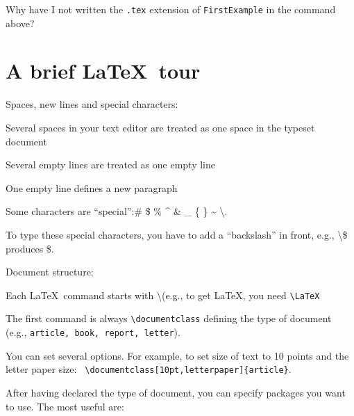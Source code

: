 Why have I not written the {\tt *.tex} extension of {\tt FirstExample} 
in the command above?  

\section{A brief \LaTeX~tour}

\begin{compactitem}\itemsep12pt
\item Spaces, new lines and special characters:

\begin{compactitem} \setlength{\itemindent}{-1em}\itemsep2pt
  \item Several spaces in your text editor are treated as one space in the
typeset document
  \item Several empty lines are treated as one empty line
  \item One empty line defines a new paragraph
  \item Some characters are ``special'':\# \$ \% \^{} \& \_ \{ \}
\~{} \textbackslash. 
  \item To type these special characters, you have to add a ``backslash'' in
front, e.g., \textbackslash\$ produces \$.
\end{compactitem}

\item Document structure:

\begin{compactitem} \setlength{\itemindent}{-1em}\itemsep2pt
  \item Each \LaTeX~command starts with \textbackslash (e.g., to get \LaTeX,
you need {\tt \textbackslash{LaTeX}}
  \item The first command is always {\tt \textbackslash{documentclass}} defining
the type of document (e.g., {\tt article, book, report, letter}).
  \item You can set several options. For example, to set size of text to 10
points and the letter paper size: {\tt
\textbackslash{documentclass[10pt,letterpaper]\{article\}}}.

\end{compactitem}

  \item After having declared the type of document, you can specify packages
    you want to use. The most useful are:


\end{compactitem}
